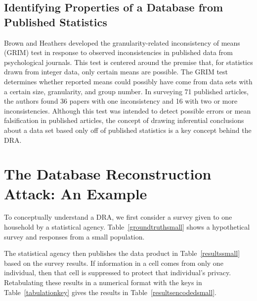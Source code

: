 \documentclass[5p,times,11pt]{elsarticle}
\begin{document}
\subsection{Identifying Properties of a Database from Published Statistics}
Brown and Heathers \cite{grim} developed the granularity-related inconsistency of means (GRIM) test in response to observed inconsistencies in published data from psychological journals. This test is centered around the premise that, for statistics drawn from integer data, only certain means are possible. The GRIM test determines whether reported means could possibly have come from data sets with a certain size, granularity, and group number. In surveying 71 published articles, the authors found 36 papers with one inconsistency and 16 with two or more inconsistencies. Although this test was intended to detect possible errors or mean falsification in published articles, the concept of drawing inferential conclusions about a data set based only off of published statistics is a key concept behind the DRA.



\section{The Database Reconstruction Attack: An Example}


To conceptually understand a DRA, we first consider a survey given to one household by a statistical agency. Table~\ref{groundtruthsmall} shows a hypothetical survey and responses from a small population.

The statistical agency then publishes the data product in Table~\ref{resultssmall} based on the survey results. If information in a cell comes from only one individual, then that cell is suppressed to protect that individual's privacy.
Retabulating these results in a numerical format with the keys in Table~\ref{tabulationkey} gives the results in Table~\ref{resultsencodedsmall}.
\end{document}
